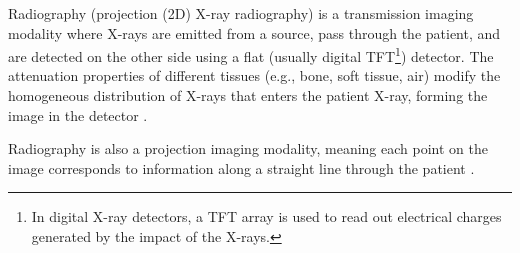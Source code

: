 
Radiography (projection (2D) X-ray radiography) is a transmission
imaging modality where X-rays are emitted from a source, pass through
the patient, and are detected on the other side using a flat (usually
digital TFT\footnote{In digital X-ray detectors, a TFT array is used
  to read out electrical charges generated by the impact of the
  X-rays.}) detector. The attenuation properties of different tissues
(e.g., bone, soft tissue, air) modify the homogeneous distribution of
X-rays that enters the patient X-ray, forming the image in the
detector \cite{bushberg2011essential}.

Radiography is also a projection imaging modality, meaning each point on
the image corresponds to information along a straight line through the
patient \cite{bushberg2011essential}.

